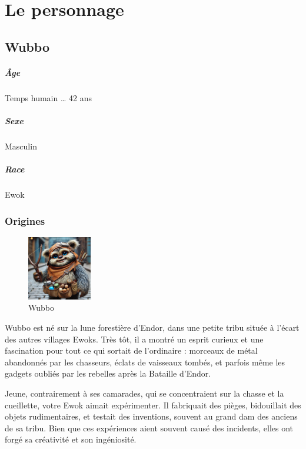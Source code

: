 \documentclass[a4paper,9pt,twoside,twocolumn,openany]{book}
\begin{document}
\newpage

\tableofcontents

\chapter{Le personnage}

\section{Wubbo}

\paragraph{\^Age} Temps humain … 42 ans
\paragraph{Sexe} Masculin
\paragraph{Race} Ewok

\subsection{Origines}

\begin{figure}
    \includegraphics[width=0.25\textwidth]{img/ewok.jpg}
    \caption{Wubbo}
\end{figure}

Wubbo est né sur la lune forestière d’Endor, dans une petite tribu située à l’écart des autres villages Ewoks.
Très tôt, il a montré un esprit curieux et une fascination pour tout ce qui sortait de l’ordinaire : morceaux de métal abandonnés par les chasseurs, éclats de vaisseaux tombés, et parfois même les gadgets oubliés par les rebelles après la Bataille d’Endor.

Jeune, contrairement à ses camarades, qui se concentraient sur la chasse et la cueillette, votre Ewok aimait expérimenter.
Il fabriquait des pièges, bidouillait des objets rudimentaires, et testait des inventions, souvent au grand dam des anciens de sa tribu. Bien que ces expériences aient souvent causé des incidents, elles ont forgé sa créativité et son ingéniosité.
\end{document}
